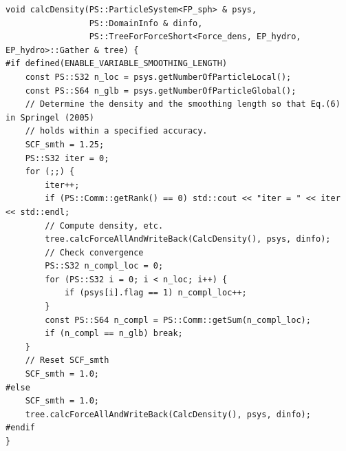 \ifCpp %
\begin{lstlisting}[caption=Function \texttt{calcDensity}]
void calcDensity(PS::ParticleSystem<FP_sph> & psys,
                 PS::DomainInfo & dinfo,
                 PS::TreeForForceShort<Force_dens, EP_hydro, EP_hydro>::Gather & tree) {
#if defined(ENABLE_VARIABLE_SMOOTHING_LENGTH)
    const PS::S32 n_loc = psys.getNumberOfParticleLocal();
    const PS::S64 n_glb = psys.getNumberOfParticleGlobal();
    // Determine the density and the smoothing length so that Eq.(6) in Springel (2005)
    // holds within a specified accuracy.
    SCF_smth = 1.25;
    PS::S32 iter = 0;
    for (;;) {
        iter++;
        if (PS::Comm::getRank() == 0) std::cout << "iter = " << iter << std::endl;
        // Compute density, etc.
        tree.calcForceAllAndWriteBack(CalcDensity(), psys, dinfo);
        // Check convergence
        PS::S32 n_compl_loc = 0;
        for (PS::S32 i = 0; i < n_loc; i++) {
            if (psys[i].flag == 1) n_compl_loc++;
        }
        const PS::S64 n_compl = PS::Comm::getSum(n_compl_loc);
        if (n_compl == n_glb) break;
    }
    // Reset SCF_smth
    SCF_smth = 1.0;
#else
    SCF_smth = 1.0;
    tree.calcForceAllAndWriteBack(CalcDensity(), psys, dinfo);
#endif
}
\end{lstlisting}
\endifCpp
\ifFtn %
